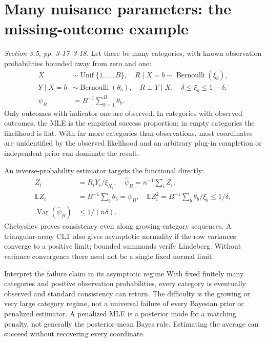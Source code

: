 \documentclass[12pt]{article}
\newcommand{\E}{\mathbb E}
\DeclareMathOperator{\Var}{Var}
\begin{document}
\section{Many nuisance parameters: the missing-outcome example}
\textit{Section 3.5, pp. 3-17--3-18.}
Let there be many categories, with known observation probabilities bounded
away from zero and one:
\begin{align}
 X&\sim\operatorname{Unif}\{1,\ldots,B\},\quad
 R\mid X=b\sim\operatorname{Bernoulli}(\xi_b),\\
 Y\mid X=b&\sim\operatorname{Bernoulli}(\theta_b),\quad
 R\perp Y\mid X,\quad\delta\le\xi_b\le1-\delta,\\
 \psi_B&=B^{-1}\sum_{b=1}^B\theta_b.
\end{align}
Only outcomes with indicator one are observed. In categories with observed
outcomes, the MLE is the empirical success proportion; in empty categories
the likelihood is flat. With far more categories than observations, most
coordinates are unidentified by the observed likelihood and an arbitrary
plug-in completion or independent prior can dominate the result.

An inverse-probability estimator targets the functional directly:
\begin{align}
 Z_i&=R_iY_i/\xi_{X_i},\quad\widehat\psi_B=n^{-1}\sum_iZ_i,\\
 \E Z_i&=B^{-1}\sum_b\theta_b=\psi_B,\quad
 \E Z_i^2=B^{-1}\sum_b\theta_b/\xi_b\le1/\delta,\\
 \Var(\widehat\psi_B)&\le1/(n\delta).
\end{align}
Chebyshev proves consistency even along growing-category sequences.
A triangular-array CLT also gives asymptotic normality if the row variances
converge to a positive limit; bounded summands verify Lindeberg. Without
variance convergence there need not be a single fixed normal limit.
\begin{correctionbox}{Interpret the failure claim in its asymptotic regime}
With fixed finitely many categories and positive observation probabilities,
every category is eventually observed and standard consistency can return.
The difficulty is the growing or very large category regime, not a universal
failure of every Bayesian prior or penalized estimator. A penalized MLE is
a posterior mode for a matching penalty, not generally the posterior-mean
Bayes rule. Estimating the average can succeed without recovering every
coordinate.
\end{correctionbox}
\end{document}
